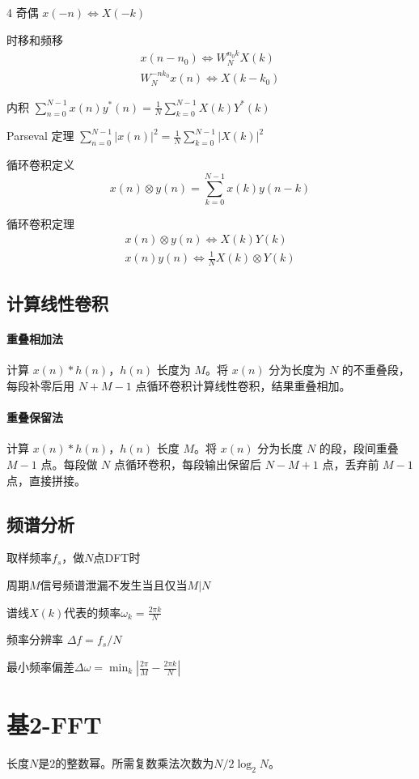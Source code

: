 \documentclass[8pt, a4paper]{extarticle}
\begin{document}
\begin{multicols}{4}
奇偶
\(
x(-n)\Leftrightarrow X(-k)
\)

时移和频移
\begin{gather*}
x(n-n_0)\Leftrightarrow W_N^{n_0k}X(k)\\
W_N^{-nk_0}x(n)\Leftrightarrow X(k-k_0)
\end{gather*}

内积
\(
\sum_{n=0}^{N-1} x(n) y^*(n) = \frac{1}{N} \sum_{k=0}^{N-1} X(k) Y^*(k)
\)

Parseval 定理
\(
\sum_{n=0}^{N-1} |x(n)|^2 = \frac{1}{N} \sum_{k=0}^{N-1} |X(k)|^2
\)

循环卷积定义
\[
x(n)\otimes y(n)=\sum_{k=0}^{N-1}x(k)y(n-k)
\]

循环卷积定理
\begin{gather*}
x(n) \otimes y(n) \Leftrightarrow X(k) Y(k) \\
x(n) y(n) \Leftrightarrow \frac{1}{N} X(k) \otimes Y(k)
\end{gather*}

\subsection{计算线性卷积}
\paragraph{重叠相加法}
计算 \(x(n)\ast h(n)\)，\(h(n)\) 长度为 \(M\)。将 \(x(n)\) 分为长度为 \(N\) 的不重叠段，每段补零后用 \(N+M-1\) 点循环卷积计算线性卷积，结果重叠相加。
\paragraph{重叠保留法}
计算 \(x(n)\ast h(n)\)，\(h(n)\) 长度 \(M\)。将 \(x(n)\) 分为长度 \(N\) 的段，段间重叠 \(M-1\) 点。每段做 \(N\) 点循环卷积，每段输出保留后 \(N-M+1\) 点，丢弃前 \(M-1\) 点，直接拼接。

\subsection{频谱分析}
取样频率\(f_s\)，做\(N\)点DFT时

周期\(M\)信号频谱泄漏不发生当且仅当\(M|N\)

谱线\(X(k)\)代表的频率\(\omega_k=\frac{2\pi k}{N}\)

频率分辨率
\(\Delta f = f_s/N\)

最小频率偏差\(\Delta \omega=\min_{k} |\frac{2\pi}{M} - \frac{2\pi k}{N}|\)

\section{基2-FFT}
长度\(N\)是\(2\)的整数幂。所需复数乘法次数为\(N/2\log_2 N\)。

\end{multicols}
\end{document}
